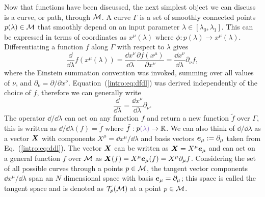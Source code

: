 Now that functions have been discussed, the next simplest object we can discuss is a curve, or path, through $\mathcal{M}$. A curve $\Gamma$ is a set of smoothly connected points $p(\lambda)\in \mathcal{M}$ that smoothly depend on an input parameter $\lambda \in [\lambda_0,\lambda_1]$. This can be expressed in terms of coordinates as $x^\mu(\lambda)$ where $\phi:p(\lambda) \rightarrow x^\mu(\lambda)$. Differentiating a function $f$ along $\Gamma$ with respect to $\lambda$ gives
\begin{equation} \label{intro:eq:dfdl}
\frac{\dd}{\dd \lambda}f(x^\mu(\lambda)) = \frac{\dd x^\nu}{\dd \lambda}\frac{\partial f(x^\mu)}{\partial x^\nu} = \frac{\dd x^\nu}{\dd \lambda}\partial_\nu f,
\end{equation}
where the Einstein summation convention was invoked, summing over all values of $\nu$, and $\partial_\nu = {\partial}/{\partial x^\nu}$. Equation~(\ref{intro:eq:dfdl}) was derived independently of the choice of $f$, therefore we can generally write
\begin{equation} \label{intro:eq:ddl}
\frac{\dd}{\dd \lambda} = \frac{\dd x^\nu}{\dd \lambda}\partial_\nu.
\end{equation}
The operator $\dd/\dd \lambda $ can act on any function $f$ and return a new function $\tilde{f}$ over {\color{orchid}$\Gamma$}, this is written as $\dd/\dd \lambda (f) = \tilde{f}$ where $\tilde{f}:p{\color{orchid}(\lambda)}\rightarrow \rspace$. We can also think of $\dd/\dd \lambda$ as a vector $\boldsymbol{X}$ with components $X^\mu=\dd x^\mu / \dd \lambda$ and basis vectors $\boldsymbol{e}_\mu:=\partial_\mu$ taken from Eq.~(\ref{intro:eq:ddl}). The vector $\boldsymbol{X}$ can be written as $\boldsymbol{X} = X^\mu \boldsymbol{e}_\mu$ and can act on a general function $f$ over $\mathcal{M}$ as $\boldsymbol{X}(f) = X^\mu \boldsymbol{e}_\mu(f) = X^\mu \partial_\mu f$. Considering the set of all possible curves through a points $p\in\mathcal{M}$, the tangent vector components $\dd x^\mu / \dd \lambda$ span an $N$ dimensional space with basis $\boldsymbol{e}_\mu = \partial_\mu$; this space is called the tangent space and is denoted as $\mathcal{T}_p(\mathcal{M})$ at a point $p\in\mathcal{M}$.

